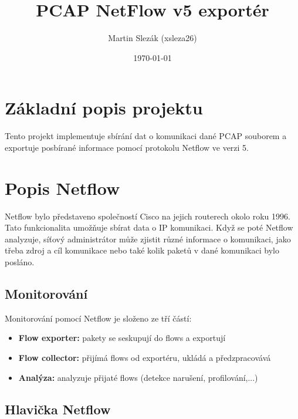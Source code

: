 \documentclass{article}
\title{PCAP NetFlow v5 exportér}
\author{Martin Slezák (xsleza26)}
\date{\today}
\begin{document}
\maketitle

\newpage

\tableofcontents

\newpage

\section{Základní popis projektu}

Tento projekt implementuje sbírání dat o komunikaci dané PCAP souborem a
exportuje posbírané informace pomocí protokolu Netflow ve verzi 5.

\section{Popis Netflow}

Netflow bylo představeno společností Cisco na jejich routerech okolo roku 1996.
Tato funkcionalita umožňuje sbírat data o IP komunikaci. Když se poté Netflow
analyzuje, síťový administrátor může zjistit různé informace o komunikaci, jako
třeba zdroj a cíl komunikace nebo také kolik paketů v dané komunikaci bylo
posláno.

\subsection{Monitorování}

Monitorování pomocí Netflow je složeno ze tří částí:
\begin{itemize}
    \item \textbf{Flow exporter:} pakety se seskupují do flows a exportují
    \item \textbf{Flow collector:} přijímá flows od exportéru, ukládá a
        předzpracovává
    \item \textbf{Analýza:} analyzuje přijaté flows
        (detekce narušení, profilování,...)
\end{itemize}

\subsection{Hlavička Netflow}
\end{document}
